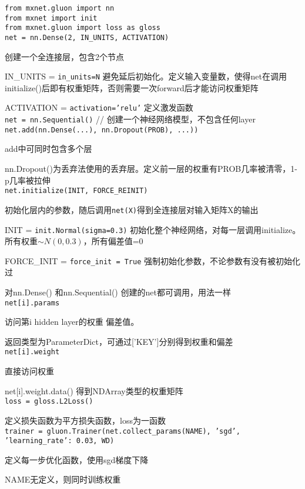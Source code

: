 \documentclass[UTF8]{ctexart}
\begin{document}
\noindent \texttt{from mxnet.gluon import nn}\\
\texttt{from mxnet import init}\\
\texttt{from mxnet.gluon import loss as gloss}\\
\texttt{net = nn.Dense(2, IN\_UNITS, ACTIVATION)}

  创建一个全连接层，包含2个节点

  IN\_UNITS = \texttt{in\_units=N} 避免延后初始化。定义输入变量数，使得net在调用initialize()后即有权重矩阵，否则需要一次forward后才能访问权重矩阵
  
  ACTIVATION = \texttt{activation='relu'} 定义激发函数\\
\texttt{net = nn.Sequential()} // 创建一个神经网络模型，不包含任何layer\\
\texttt{net.add(nn.Dense(...), nn.Dropout(PROB), ...))}

  add中可同时包含多个层
  
  nn.Dropout()为丢弃法使用的丢弃层。定义前一层的权重有PROB几率被清零，1-p几率被拉伸\\
\texttt{net.initialize(INIT, FORCE\_REINIT)} 

  初始化层内的参数，随后调用\texttt{net(X)}得到全连接层对输入矩阵X的输出
  
  INIT = \texttt{init.Normal(sigma=0.3)} 初始化整个神经网络，对每一层调用initialize。所有权重$\sim N(0, 0.3)$，所有偏差值=0
  
  FORCE\_INIT = \texttt{force\_init = True} 强制初始化参数，不论参数有没有被初始化过
  
  对nn.Dense() 和nn.Sequential() 创建的net都可调用，用法一样\\
\texttt{net[i].params}

  访问第i hidden layer的权重 偏差值。
  
  返回类型为ParameterDict，可通过['KEY']分别得到权重和偏差\\
\texttt{net[i].weight} 
  
  直接访问权重

  net[i].weight.data() 得到NDArray类型的权重矩阵\\
\texttt{loss = gloss.L2Loss()}
  
  定义损失函数为平方损失函数，loss为一函数\\
\texttt{trainer = gluon.Trainer(net.collect\_params(NAME), 'sgd', {'learning\_rate': 0.03}, WD)}

  定义每一步优化函数，使用sgd梯度下降
  
  NAME无定义，则同时训练权重
  
\end{document}
